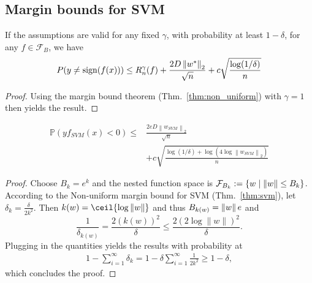 \subsection{Margin bounds for SVM}

\begin{theorem}
If the assumptions are valid for any fixed $\gamma$, with probability at least $1 - \delta$, for any $f \in \mathcal{F}_{B}$, we have
$$
P(y \neq \operatorname{sign}(f(x))) \leq R_{n}^{\gamma}(f)+\frac{2 D \left\lVert w^* \right\rVert_2}{ \sqrt{n}}+c \sqrt{\frac{\log (1 / \delta)}{n}}
$$
\end{theorem}
\begin{proof}
Using the margin bound theorem (Thm.~\ref{thm:non_uniform}) with $\gamma = 1$ then yields the result.
\end{proof}

\begin{theorem}
\begin{align*}
\mathbb{P}(y f_{SVM}(x)<0) \leq & \frac{2 e D\left\|w_{S V M}\right\|_{2}}{\sqrt{n}} \\ & +c \sqrt{\frac{\log (1 / \delta)+\log \left(4 \log \left\|w_{S V M}\right\|_{2}\right)}{n}}
\end{align*}
\end{theorem}
\begin{proof}
Choose $B_k = e^k$ and the nested function space is $\mathcal{F}_{B_k} := \{ w \mid \left\lVert w \right\rVert \leq B_k \}$. According to the Non-uniform margin bound for SVM (Thm.~\ref{thm:svm}), let $\delta_k = \frac{\delta}{2k^2}$.
Then $k(w) = \ceil{\log \norm{w}}$ and thus $B_{k(w)} = \left\lVert w \right\rVert e$ and 
$$
\frac{1}{\delta_{k(w)}}=\frac{2 (k(w))^{2}}{\delta} \leq \frac{2(2 \log \|w\|)^{2}}{\delta}.
$$
Plugging in the quantities yields the results with probability at
\begin{align*}
    1 - \sum_{i=1}^\infty \delta_k = 1 - \delta \sum_{i=1}^\infty \frac{1}{2k^2} \geq 1 - \delta,
\end{align*}
which concludes the proof.
\end{proof}